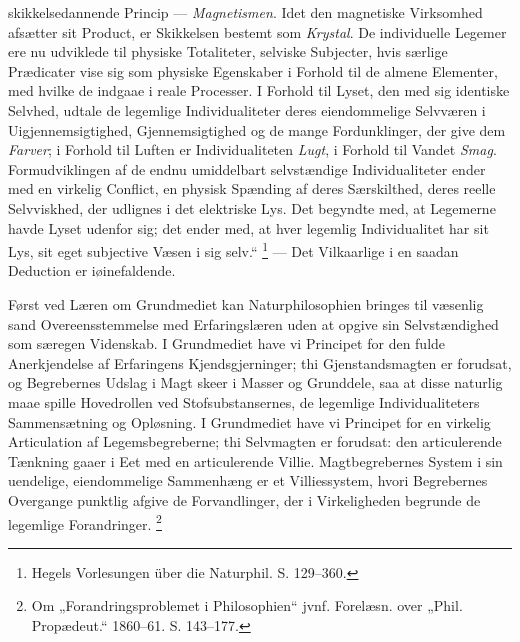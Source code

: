 \documentclass[12pt,a4paper]{book}
\renewcommand{\thefootnote}{*)}
\begin{document}
skikkelsedannende Princip --- \emph{Magnetismen}. Idet den magnetiske
Virksomhed afsætter sit Product, er Skikkelsen bestemt som
\emph{Krystal}. De individuelle Legemer ere nu udviklede til physiske
Totaliteter, selviske Subjecter, hvis særlige Prædicater vise sig som
physiske Egenskaber i Forhold til de almene Elementer, med hvilke de
indgaae i reale Processer. I Forhold til Lyset, den med sig identiske
Selvhed, udtale de legemlige Individualiteter deres eiendommelige
Selvværen i Uigjennemsigtighed, Gjennemsigtighed og de mange
Fordunklinger, der give dem \emph{Farver}; i Forhold til Luften er
Individualiteten \emph{Lugt}, i Forhold til Vandet \emph{Smag}.
Formudviklingen af de endnu umiddelbart selvstændige Individualiteter
ender med en virkelig Conflict, en physisk Spænding af deres
Særskilthed, deres reelle Selvviskhed, der udlignes i det elektriske
Lys. Det begyndte med, at Legemerne havde Lyset udenfor sig; det ender
med,
at hver legemlig Individualitet har sit Lys, sit eget subjective Væsen
i sig selv.“%
\footnote{%
Hegels Vorlesungen über die Naturphil. S. 129--360.}
--- Det Vilkaarlige i en saadan Deduction er iøinefaldende.

Først ved Læren om Grundmediet kan Naturphilosophien bringes til
væsenlig sand Overeensstemmelse med Erfaringslæren uden at opgive sin
Selvstændighed som særegen Videnskab. I Grundmediet have vi Principet
for den fulde Anerkjendelse af Erfaringens Kjendsgjerninger; thi
Gjenstandsmagten er forudsat, og Begrebernes Udslag i Magt skeer i
Masser og Grunddele, saa at disse naturlig maae spille Hovedrollen ved
Stofsubstansernes, de legemlige Individualiteters Sammensætning og
Opløsning. I Grundmediet have vi Principet for en virkelig
Articulation af Legemsbegreberne; thi Selvmagten er forudsat: den
articulerende Tænkning gaaer i Eet med en articulerende Villie.
Magtbegrebernes System i sin uendelige, eiendommelige Sammenhæng er et
Villiessystem, hvori Begrebernes Overgange punktlig afgive de
Forvandlinger, der i Virkeligheden begrunde de legemlige
Forandringer.%
\renewcommand{\thefootnote}{**)}%
\footnote{%
Om „Forandringsproblemet i Philosophien“ jvnf. Forelæsn. over
„Phil. Propædeut.“ 1860--61. S. 143--177.}%
\renewcommand{\thefootnote}{*)}
\end{document}
